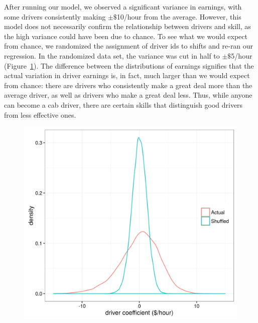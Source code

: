 \documentclass[twocolumn]{article}
\begin{document}
After running our model, we observed a significant variance in earnings, with some drivers consistently making $\pm$$\$$10/hour from the average. However, this model does not necessarily confirm the relationship between drivers and skill, as the high variance could have been due to chance. To see what we would expect from chance, we randomized the assignment of driver ids to shifts and re-ran our regression. In the randomized data set, the variance was cut in half to $\pm$$\$$5/hour (Figure~\ref{fig:efficiency}). The difference between the distributions of earnings signifies that the actual variation in driver earnings is, in fact, much larger than we would expect from chance: there are drivers who consistently make a great deal more than the average driver, as well as drivers who make a great deal less. Thus, while anyone can become a cab driver, there are certain skills that distinguish good drivers from less effective ones.
\begin{figure}[t]
  \centering
  \includegraphics[width=.9\linewidth]{efficiency}
  \label{fig:efficiency}
\end{figure}
\end{document}
